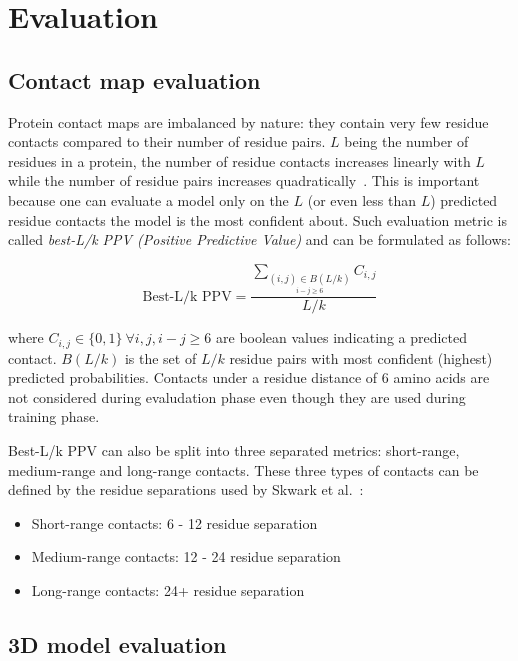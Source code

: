 \section{Evaluation}

  \subsection{Contact map evaluation}

    Protein contact maps are imbalanced by nature: they contain very few residue contacts compared to their number of residue pairs.
    $L$ being the number of residues in a protein, the number of residue contacts increases linearly with $L$ while the number of residue pairs
    increases quadratically~\cite{OLMEA1997S25}. This is important because one can evaluate a model only on the $L$ (or even less than $L$) predicted
    residue contacts the model is the most confident about. Such evaluation metric is called \textit{best-L/k PPV (Positive Predictive Value)}
    and can be formulated as follows:

    \begin{equation}
      \text{Best-L/k PPV} = \frac{\sum_{\underset {i-j \geq 6}{(i, j) \in B(L/k)}} C_{i, j}}{L/k}
    \end{equation}

    where $C_{i, j} \in \{0, 1\} \ \forall i, j, i-j \ge 6$ are boolean values indicating a predicted contact.
    $B(L/k)$ is the set of $L/k$ residue pairs with most confident (highest) predicted probabilities.
    Contacts under a residue distance of 6 amino acids are not considered during evaludation phase even though they are used during
    training phase.

    Best-L/k PPV can also be split into three separated metrics: short-range, medium-range and long-range contacts.
    These three types of contacts can be defined by the residue separations used by Skwark et al.~\cite{10.1371/journal.pcbi.1003889}:

      \begin{itemize}
        \item Short-range contacts: 6 - 12 residue separation
        \item Medium-range contacts: 12 - 24 residue separation
        \item Long-range contacts: 24+ residue separation
      \end{itemize}

  \subsection{3D model evaluation}

